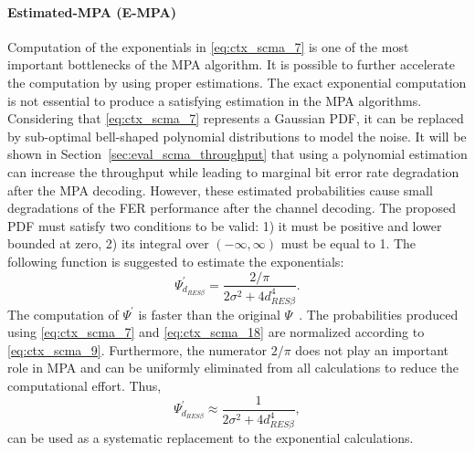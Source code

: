 \paragraph{Estimated-MPA (E-MPA)}

Computation of the exponentials in \eqref{eq:ctx_scma_7} is one of the most
important bottlenecks of the MPA algorithm. It is possible to further accelerate
the computation by using proper estimations. The exact exponential computation
is not essential to produce a satisfying estimation in the MPA algorithms.
Considering that \eqref{eq:ctx_scma_7} represents a Gaussian PDF, it can be
replaced by sub-optimal bell-shaped polynomial distributions to model the noise.
It will be shown in Section~\ref{sec:eval_scma_throughput} that using a
polynomial estimation can increase the throughput while leading to marginal bit
error rate degradation after the MPA decoding. However, these estimated
probabilities cause small degradations of the FER performance after the channel
decoding. The proposed PDF must satisfy two conditions to be valid: 1) it must
be positive and lower bounded at zero, 2) its integral over $(-\infty, \infty)$
must be equal to 1. The following function is suggested to estimate the
exponentials:
\begin{equation}
  \label{eq:ctx_scma_18}
  \Psi^{'}_{d_{RES \beta}} = \frac{2 / \pi}{2\sigma^2 + 4d^4_{RES \beta}}.
\end{equation}
The computation of $\Psi^{'}$ is faster than the original
$\Psi$~\cite{Ghaffari2017,Ghaffari2019}. The probabilities produced using
\eqref{eq:ctx_scma_7} and \eqref{eq:ctx_scma_18} are normalized according to
\eqref{eq:ctx_scma_9}. Furthermore, the numerator $2/\pi$ does not play an
important role in MPA and can be uniformly eliminated from all calculations to
reduce the computational effort. Thus,
\begin{equation}
  \label{eq:ctx_scma_19}
  \Psi^{'}_{d_{RES \beta}} \approx \frac{1}{2\sigma^2 + 4d^4_{RES \beta}},
\end{equation}
can be used as a systematic replacement to the exponential calculations.



